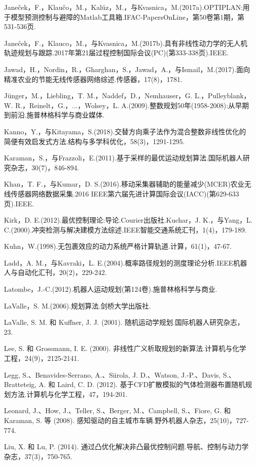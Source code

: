 \documentclass[10pt]{article}
\begin{document}
Janeček，F.，Klaučo，M.，Kalúz，M.，与Kvasnica，M.(2017a).OPTIPLAN:用于模型预测控制与避障的Matlab工具箱.IFAC-PapersOnLine，第50卷第1期，第531-536页.

Janeček，F.，Klauco，M.，与Kvasnica，M.(2017b).具有非线性动力学的无人机轨迹规划与跟踪.2017年第21届过程控制国际会议(PC)(第333-338页).IEEE.

Jawad，H.，Nordin，R.，Gharghan，S.，Jawad，A.，与Ismail，M.(2017).面向精准农业的节能无线传感器网络综述.传感器，17(8)，1781.

Jünger，M.，Liebling，T. M.，Naddef，D.，Nemhauser，G. L.，Pulleyblank，W. R.，Reinelt，G.，...，Wolsey，L. A.(2009).整数规划50年(1958-2008):从早期到前沿.施普林格科学与商业媒体.

Kanno，Y.，与Kitayama，S.(2018).交替方向乘子法作为混合整数非线性优化的简便有效启发式方法.结构与多学科优化，58(3)，1291-1295.

Karaman，S.，与Frazzoli，E.(2011).基于采样的最优运动规划算法.国际机器人研究杂志，30(7)，846-894.

Khan，T. F.，与Kumar，D. S.(2016).移动采集器辅助的能量减少(MCER)农业无线传感器网络数据采集.2016 IEEE第六届先进计算国际会议(IACC)(第629-633页).IEEE.

Kirk，D. E.(2012).最优控制理论:导论.Courier出版社.Kuchar，J. K.，与Yang，L. C.(2000).冲突检测与解决建模方法综述.IEEE智能交通系统汇刊，1(4)，179-189.

Kuhn，W.(1998).无包裹效应的动力系统严格计算轨道.计算，61(1)，47-67.

Ladd，A. M.，与Kavraki，L. E.(2004).概率路径规划的测度理论分析.IEEE机器人与自动化汇刊，20(2)，229-242.

Latombe，J.-C.(2012).机器人运动规划(第124卷).施普林格科学与商业.

LaValle，S. M.(2006).规划算法.剑桥大学出版社.

LaValle, S. M. 和 Kuffner, J. J. (2001). 随机运动学规划.国际机器人研究杂志，23.

Lee, S. 和 Grossmann, I. E. (2000). 非线性广义析取规划的新算法.计算机与化学工程，24(9)，2125-2141.

Legg, S.、Benavides-Serrano, A.、Siirola, J. D.、Watson, J.-P.、Davis, S.、Bratteteig, A. 和 Laird, C. D. (2012). 基于CFD扩散模拟的气体检测器布置随机规划方法.计算机与化学工程，47，194-201.

Leonard, J.、How, J.、Teller, S.、Berger, M.、Campbell, S.、Fiore, G. 和 Karaman, S. 等 (2008). 感知驱动的自主城市车辆.野外机器人杂志，25(10)，727-774.

Liu, X. 和 Lu, P. (2014). 通过凸优化解决非凸最优控制问题.导航、控制与动力学杂志，37(3)，750-765.
\end{document}
